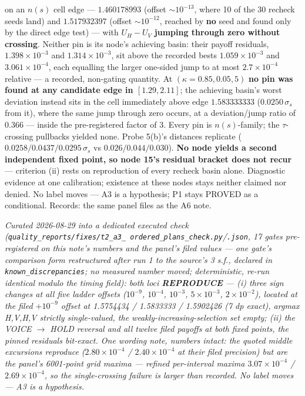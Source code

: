 \documentclass[11pt,a4paper]{article}
\begin{document}
\begin{description}[leftmargin=1.9em,style=unboxed]
{  on an $n(s)$ cell edge --- $1.460178993$ (offset ${\sim}10^{-13}$, where 10 of the 30
  recheck seeds land) and $1.517932397$ (offset ${\sim}10^{-12}$, reached by \textbf{no}
  seed and found only by the direct edge test) --- with $U_H - U_V$ \textbf{jumping
  through zero without crossing}. Neither pin is its node's achieving basin: their payoff
  residuals, $1.398\times10^{-3}$ and $1.314\times10^{-3}$, sit above the recorded bests
  $1.059\times10^{-3}$ and $3.061\times10^{-4}$, each equalling the larger one-sided jump
  to at most $2.7\times10^{-4}$ relative --- a recorded, non-gating quantity. At
  $(\kappa{=}0.85, 0.05, 5)$ \textbf{no pin was found at any candidate edge in
  $[1.29, 2.11]$}; the achieving basin's worst deviation instead sits in the cell
  immediately above edge $1.583333333$ ($0.0250\,\sigma_s$ from it), where the same jump
  through zero occurs, at a deviation/jump ratio of $0.366$ --- inside the pre-registered
  factor of 3. Every pin is $n(s)$-family; the $\tau$-crossing pullbacks yielded none.
  Probe 5(b)'s distances replicate ($0.0258/0.0437/0.0295\,\sigma_s$ vs
  $0.026/0.044/0.030$). \textbf{No node yields a second independent fixed point, so node
  15's residual bracket does not recur} --- criterion (ii) rests on reproduction of every
  recheck basin alone. Diagnostic evidence at one calibration; existence at these nodes
  stays neither claimed nor denied.} No label moves --- A3 is a hypothesis; P1 stays
  PROVED as a conditional. Records: the same panel files as the A6 note.

  \emph{Curated 2026-08-29 into a dedicated executed check
  (\texttt{quality\_reports/\allowbreak fixes/\allowbreak t2\_a3\_\allowbreak
  ordered\_plans\_check.py}/\texttt{.json},
  17 gates pre-registered on this note's numbers and the panel's filed values --- one gate's
  comparison form restructured after run 1 to the source's 3 s.f., declared in
  \texttt{known\_discrepancies}; no measured number moved; deterministic, re-run identical
  modulo the timing field): both loci \textbf{REPRODUCE} --- (i) three sign changes at all five
  ladder offsets ($10^{-9}$, $10^{-4}$, $10^{-3}$, $5\times10^{-3}$, $2\times10^{-2}$),
  located at the filed $+10^{-9}$ offset at 1.5754434 / 1.5833333 / 1.5902426 (7 dp exact),
  argmax H,V,H,V strictly single-valued, the weakly-increasing-selection set empty; (ii) the
  VOICE $\to$ HOLD reversal and all twelve filed payoffs at both fixed points, the pinned
  residuals bit-exact. One wording note, numbers intact: the quoted middle excursions reproduce
  ($2.80\times10^{-4}$ / $2.40\times10^{-4}$ at their filed precision) but are the panel's
  6001-point grid maxima --- refined per-interval maxima $3.07\times10^{-4}$ /
  $2.69\times10^{-4}$, so the single-crossing failure is larger than recorded. No label moves
  --- A3 is a hypothesis.}


\end{description}
\end{document}
